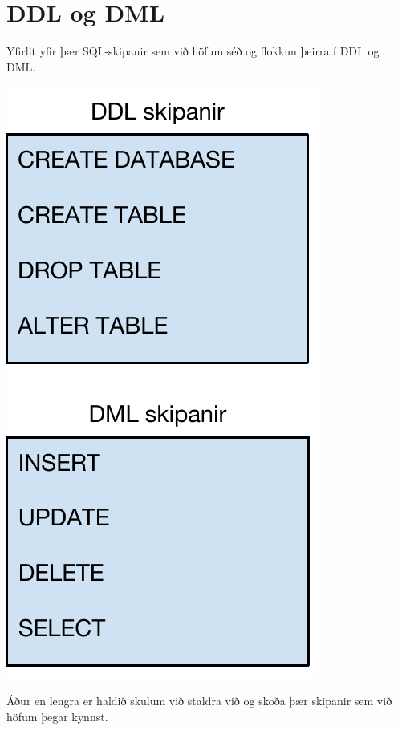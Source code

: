 \section{DDL og DML}
\begin{marginfigure}[-6cm]
\caption[DDL og DML]{Yfirlit yfir þær SQL-skipanir sem við höfum séð og flokkun þeirra í DDL og DML.}
\label{mynd:ddl-dml}
\centering
\includegraphics[width=\linewidth]{myndir/ddl-dml}
\end{marginfigure}
Áður en lengra er haldið skulum við staldra við og skoða þær skipanir sem við höfum þegar kynnst.

